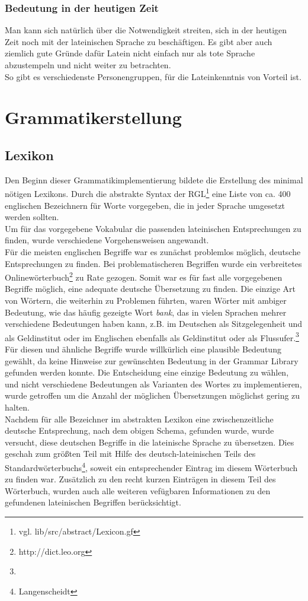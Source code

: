 \documentclass[11pt]{scrartcl}
\begin{document}
\subsubsection{Bedeutung in der heutigen Zeit}
Man kann sich natürlich über die Notwendigkeit streiten, sich in der heutigen Zeit noch mit der lateinischen Sprache zu beschäftigen. Es gibt aber auch ziemlich gute Gründe dafür Latein nicht einfach nur als tote Sprache abzustempeln und nicht weiter zu betrachten. \\
So gibt es verschiedenste Personengruppen, für die Lateinkenntnis von Vorteil ist.
\section{Grammatikerstellung}
\subsection{Lexikon}
Den Beginn dieser Grammatikimplementierung bildete die Erstellung des minimal nötigen Lexikons. Durch die abstrakte Syntax der RGL\footnote{vgl. lib/src/abstract/Lexicon.gf} eine Liste von ca. 400 englischen Bezeichnern für Worte vorgegeben, die in jeder Sprache umgesetzt werden sollten. \\
Um für das vorgegebene Vokabular die passenden lateinischen Entsprechungen zu finden, wurde verschiedene Vorgehensweisen angewandt. \\
Für die meisten englischen Begriffe war es zunächst problemlos möglich, deutsche Entsprechungen zu finden. Bei problematischeren Begriffen wurde ein verbreitetes Onlinewörterbuch\footnote{http://dict.leo.org} zu Rate gezogen. Somit war es für fast alle vorgegebenen Begriffe möglich, eine adequate deutsche Übersetzung zu finden. Die einzige Art von Wörtern, die weiterhin zu Problemen führten, waren Wörter mit ambiger Bedeutung, wie das häufig gezeigte Wort \textit{bank}, das in vielen Sprachen mehrer verschiedene Bedeutungen haben kann, z.B. im Deutschen als Sitzgelegenheit und als Geldinstitut oder im Englischen ebenfalls als Geldinstitut oder als Flussufer.\footnote{} Für diesen und ähnliche Begriffe wurde willkürlich eine plausible Bedeutung gewählt, da keine Hinweise zur gewünschten Bedeutung in der Grammar Library gefunden werden konnte. Die Entscheidung eine einzige Bedeutung zu wählen, und nicht verschiedene Bedeutungen als Varianten des Wortes zu implementieren, wurde getroffen um die Anzahl der möglichen Übersetzungen möglichst gering zu halten. \\
Nachdem für alle Bezeichner im abstrakten Lexikon eine zwischenzeitliche deutsche Entsprechung, nach dem obigen Schema, gefunden wurde, wurde versucht, diese deutschen Begriffe in die lateinische Sprache zu übersetzen. Dies geschah zum größten Teil mit Hilfe des deutsch-lateinischen Teils des Standardwörterbuchs\footnote{Langenscheidt}, soweit ein entsprechender Eintrag im diesem Wörterbuch zu finden war. Zusätzlich zu den recht kurzen Einträgen in diesem Teil des Wörterbuch, wurden auch alle weiteren vefügbaren Informationen zu den gefundenen lateinischen Begriffen berücksichtigt. \\
\end{document}
